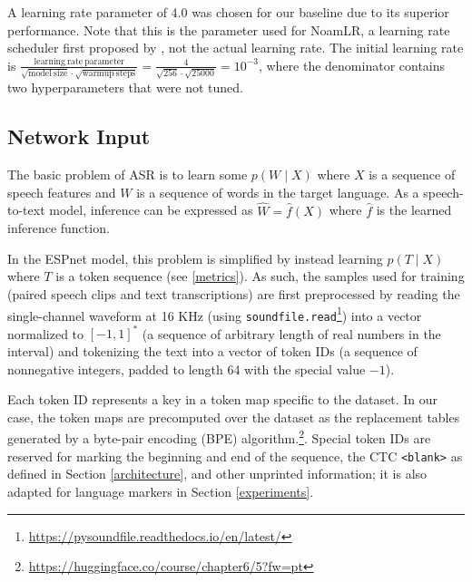 \documentclass{article}
\begin{document}
  A learning rate parameter of 4.0 was chosen for our baseline due to its superior performance. Note that this is the parameter used for NoamLR, a learning rate scheduler first proposed by \cite{Vaswani}, not the actual learning rate. The initial learning rate is $\frac{\mathrm{learning\ rate\ parameter}}{\sqrt{\mathrm{model\ size}} \cdot \sqrt{\mathrm{warmup\ steps}}} = \frac{4}{\sqrt{256} \cdot \sqrt{25000}} = 10^{-3}$, where the denominator contains two hyperparameters that were not tuned.
  \subsection{Network Input} \label{network-input}
  The basic problem of ASR is to learn some $p(W \mid X)$ where $X$ is a sequence of speech features and $W$ is a sequence of words in the target language. As a speech-to-text model, inference can be expressed as $\hat{W} = \hat{f}(X)$ where $\hat{f}$ is the learned inference function.

  In the ESPnet model, this problem is simplified by instead learning $p(T \mid X)$ where $T$ is a token sequence (see \ref{metrics}). As such, the samples used for training (paired speech clips and text transcriptions) are first preprocessed by reading the single-channel waveform at 16 KHz (using \texttt{soundfile.read}\footnote{\url{https://pysoundfile.readthedocs.io/en/latest/}}) into a vector normalized to $[-1, 1]^*$ (a sequence of arbitrary length of real numbers in the interval) and tokenizing the text into a vector of token IDs (a sequence of nonnegative integers, padded to length 64 with the special value $-1$).

  Each token ID represents a key in a token map specific to the dataset. In our case, the token maps are precomputed over the dataset as the replacement tables generated by a byte-pair encoding (BPE) algorithm.\footnote{\url{https://huggingface.co/course/chapter6/5?fw=pt}}. Special token IDs are reserved for marking the beginning and end of the sequence, the CTC \texttt{<blank>} as defined in Section \ref{architecture}, and other unprinted information; it is also adapted for language markers in Section \ref{experiments}.
\end{document}
